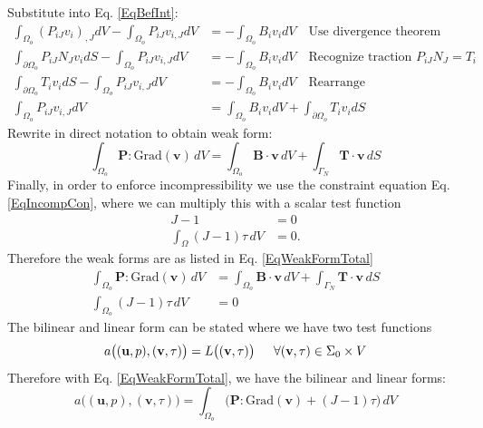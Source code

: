 \documentclass[12pt,3p]{article}
\begin{document}
Substitute into Eq. \ref{EqBefInt}:
\begin{align*}
\int_{\Omega_o} (P_{iJ} v_i)_{,J} dV - \int_{\Omega_o} P_{iJ} v_{i,J} dV &= - \int_{\Omega_o} B_i v_i dV \quad \text{Use divergence theorem} \\
\int_{\partial \Omega_o} P_{iJ} N_J v_i dS - \int_{\Omega_o} P_{iJ} v_{i,J} dV &= - \int_{\Omega_o} B_i v_i dV \quad \text{Recognize traction } P_{iJ} N_J = T_i\\
\int_{\partial \Omega_o} T_i v_i dS - \int_{\Omega_o} P_{iJ} v_{i,J} dV &= - \int_{\Omega_o} B_i v_i dV \quad \text{Rearrange} \\
\int_{\Omega_o} P_{iJ} v_{i,J} dV &= \int_{\Omega_o} B_i v_i dV + \int_{\partial \Omega_o} T_i v_i dS 
\end{align*}
Rewrite in direct notation to obtain weak form: 
\begin{equation}\label{EqWeakFormDirect}
 \int_{\Omega_o} \mathbf{P} : \text{Grad}(\mathbf{v}) \, dV = \int_{\Omega_o} \mathbf{B} \cdot \mathbf{v} \, dV + \int_{\Gamma_N} \mathbf{T} \cdot \mathbf{v} \, dS
\end{equation}
Finally, in order to enforce incompressibility we use the constraint equation Eq. \ref{EqIncompCon}, where we can multiply this with a scalar test function
\begin{align*}
 J - 1 &= 0 \\ 
\int_{\Omega} (J-1) \tau \, dV &= 0. 
\end{align*}
Therefore the weak forms are as listed in Eq. \ref{EqWeakFormTotal}
\begin{subequations}\label{EqWeakFormTotal}
\begin{align}
 \int_{\Omega_o} \mathbf{P} : \text{Grad}(\mathbf{v}) \, dV &= \int_{\Omega_o} \mathbf{B} \cdot \mathbf{v} \, dV + \int_{\Gamma_N} \mathbf{T} \cdot \mathbf{v} \, dS \\
\int_{\Omega_o} (J - 1) \tau \, dV &= 0
\end{align}
\end{subequations}
The bilinear and linear form can be stated where we have two test functions
\begin{equation*}
a \big( (\mathbf{u}, p),( \mathbf{v}, \tau) \big) = L \big( (\mathbf{v}, \tau) \big) \indent \forall (\mathbf{v}, \tau) \in \Sigma_0 \times V 
\end{equation*}
Therefore with Eq. \ref{EqWeakFormTotal}, we have the bilinear and linear forms: 
\begin{equation}\label{EqBilinear}
a \big( (\mathbf{u}, p),( \mathbf{v}, \tau) \big) 
	= \int_{\Omega_o} \big( \mathbf{P} : \text{Grad}(\mathbf{v}) 
	+ (J-1) \tau \big) \, dV
\end{equation}
\end{document}

